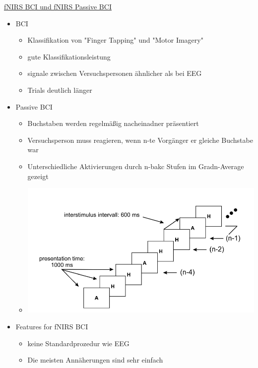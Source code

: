 \documentclass[a4paper,10pt,oneside]{article}
\begin{document}
\underline{fNIRS BCI und fNIRS Passive BCI} \\
 	\begin{itemize}
 		\item BCI
 			\begin{itemize}
 				\item Klassifikation von "Finger Tapping" und "Motor Imagery"
 				\item gute Klassifikationsleistung
 				\item signale zwischen Versuchspersonen ähnlicher als bei EEG
 				\item Trials deutlich länger
 			\end{itemize}
		\item Passive BCI
			\begin{itemize}
				\item Buchstaben werden regelmäßig nacheinadner präsentiert
				\item Versuchsperson muss reagieren, wenn n-te Vorgänger er gleiche Buchstabe war
				\item Unterschiedliche Aktivierungen durch n-bakc Stufen im Gradn-Average gezeigt
				\item[]\includegraphics[scale=0.2]{Grafiken/2117.png}
			\end{itemize}
		\item Features for fNIRS BCI
			\begin{itemize}
				\item keine Standardprozedur wie EEG
				\item Die meisten Annäherungen sind sehr einfach
			\end{itemize}
 	\end{itemize}
 
\end{document}

